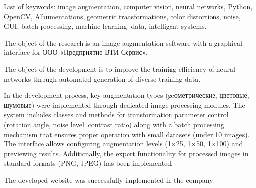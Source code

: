List of keywords: image augmentation, computer vision, neural networks, Python, OpenCV, Albumentations, geometric transformations, color distortions, noise, GUI, batch processing, machine learning, data, intelligent systems.

The object of the research is an image augmentation software with a graphical interface for ООО «Предприятие ВТИ-Сервис».

The object of the development is to improve the training efficiency of neural networks through automated generation of diverse training data.


In the development process, key augmentation types (geометрические, цветовые, шумовые) were implemented through dedicated image processing modules. The system includes classes and methods for transformation parameter control (rotation angle, noise level, contrast ratio) along with a batch processing mechanism that ensures proper operation with small datasets (under 10 images). The interface allows configuring augmentation levels (1×25, 1×50, 1×100) and previewing results. Additionally, the export functionality for processed images in standard formats (PNG, JPEG) has been implemented.

The developed website was successfully implemented in the company.

